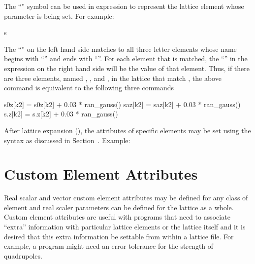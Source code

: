 {{{{{The ``\vn{\%}'' symbol can be used in expression to represent the lattice element whose parameter is
being set. For example:
\begin{example}
  s%
\end{example}
The ``'' on the left hand side matches to all three letter elements whose name begins with
``'' and ends with ``''. For each element that is matched, the ``\vn{\%[k2]}'' in the
expression on the right hand side will be the  value of that element. Thus, if there are three
elements, named , , and , in the lattice that match , the above command
is equivalent to the following three commands
\begin{example}
  s0z[k2] = s0z[k2] + 0.03 * ran_gauss()
  saz[k2] = saz[k2] + 0.03 * ran_gauss()
  s.z[k2] = s.z[k2] + 0.03 * ran_gauss()
\end{example}

After lattice expansion (), the attributes of specific elements may be set using the
syntax as discussed in Section~. Example:

\newpage

\section{Custom Element Attributes}
\label{s:cust.att}

Real scalar and vector custom element attributes may be defined for any class of element and real
scaler parameters can be defined for the lattice as a whole.  Custom element attributes are useful
with programs that need to associate ``extra'' information with particular lattice elements or the
lattice itself and it is desired that this extra information be settable from within a lattice
file. For example, a program might need an error tolerance for the strength of quadrupoles.

}}}}}
